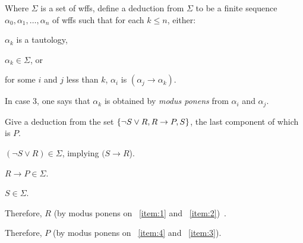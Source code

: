 \begin{problem}
  Where $\Sigma$ is a set of wffs,
  define a deduction from $\Sigma$ to be a finite sequence
  $\alpha_0, \alpha_1, \ldots, \alpha_n$ of wffs
  such that for each $k \le n$, either:
  \begin{enumroman}
    \item $\alpha_k$ is a tautology,
    \item $\alpha_k \in \Sigma$, or
    \item for some $i$ and $j$ less than $k$, $\alpha_i$ is $(\alpha_j \to \alpha_k)$.
  \end{enumroman}
  
  \step
  In case 3, one says that $\alpha_k$ is obtained by \emph{modus ponens}
  from $\alpha_i$ and $\alpha_j$.
  
  \step
  Give a deduction from the set $\left\{ \lnot S \lor R, R \to P, S\right\}$, the last component of which is $P$.
\end{problem}
\begin{Answer}
  \begin{enumroman}
    \item $(\lnot S \lor R) \in \Sigma$, implying $(S \to R$).~\label{item:1}
    \item $R \to P \in \Sigma$.~\label{item:4}
    \item $S \in \Sigma$.~\label{item:2}
    \item Therefore, $R$ (by modus ponens on ~\ref{item:1} and ~\ref{item:2})~\label{item:3}.
    \item Therefore, $P$ (by modus ponens on ~\ref{item:4} and ~\ref{item:3}).
  \end{enumroman}
\end{Answer}
